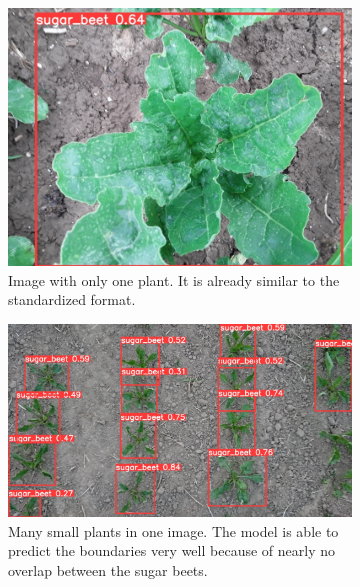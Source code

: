 \begin{figure}[htb!]
	\begin{subfigure}{.4\textwidth}
		\centering
		\includegraphics[scale=0.19]{figures/result_1.jpg}
		\caption{Image with only one plant. It is already similar to the standardized format.}
		\label{fig:result_1}
	\end{subfigure}%
	\begin{subfigure}{.6\textwidth}
		\centering
		\includegraphics[scale=0.15]{figures/result_2.JPG}
		\caption{Many small plants in one image. The model is able to predict the boundaries very well because of nearly no overlap between the sugar beets.}
		\label{fig:result_2}
	\end{subfigure}
	\begin{subfigure}{.4\textwidth}
		\centering

\end{subfigure}
\end{figure}

